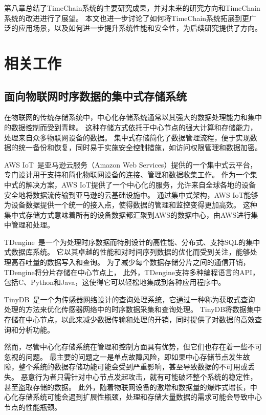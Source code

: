 第八章总结了TimeChain系统的主要研究成果，并对未来的研究方向和TimeChain系统的改进进行了展望。
本文也进一步讨论了如何将TimeChain系统拓展到更广泛的应用场景，以及如何进一步提升系统性能和安全性，为后续研究提供了方向。

\chapter{相关工作}
\section{面向物联网时序数据的集中式存储系统}
在物联网的传统存储系统中，中心化存储系统通常以其强大的数据处理能力和集中的数据控制而受到青睐。
这种存储方式依托于中心节点的强大计算和存储能力，处理来自众多物联网设备的数据。
集中式存储简化了数据管理流程，便于实现数据的统一备份和恢复，同时易于实施安全控制措施，如访问权限管理和数据加密。

AWS IoT~\cite{aws}是亚马逊云服务（Amazon Web Services）提供的一个集中式云平台，专门设计用于支持和简化物联网设备的连接、管理和数据收集工作。
作为一个集中式的解决方案，AWS IoT提供了一个中心化的服务，允许来自全球各地的设备安全地将数据流传输到亚马逊的云基础设施中。
通过集中式架构，AWS IoT能够为设备数据提供一个统一的接入点，使得数据的管理和监控变得更加高效。
这种集中式存储方式意味着所有的设备数据都汇聚到AWS的数据中心，由AWS进行集中管理和处理。

TDengine~\cite{tdengine}是一个为处理时序数据而特别设计的高性能、分布式、支持SQL的集中式数据库系统。
它以其卓越的性能和对时间序列数据的优化而受到关注，能够处理高吞吐量的数据写入和查询。
为了减少每个数据存储分片之间的通信开销，TDengine将分片存储在中心节点上，
此外，TDengine支持多种编程语言的API，包括C、Python和Java，这使得它可以轻松地集成到各种应用程序中。

TinyDB~\cite{madden2005tinydb}是一个为传感器网络设计的查询处理系统，它通过一种称为获取式查询处理的方法来优化传感器网络中的时序数据采集和查询处理。
TinyDB将数据集中存储在中心节点，以此来减少数据传输和处理的开销，同时提供了对数据的高效查询和分析功能。

然而，尽管中心化存储系统在管理和控制方面具有优势，但它们也存在着一些不可忽视的问题。
最主要的问题之一是单点故障风险，即如果中心存储节点发生故障，整个系统的数据存储功能可能会受到严重影响，甚至导致数据的不可用或丢失。
恶意行为者只需针对中心节点发起攻击，就有可能破坏整个系统的稳定性，甚至盗取存储的数据。
此外，随着物联网设备的激增和数据量的爆炸式增长，中心化存储系统可能会遇到扩展性瓶颈，处理和存储大量数据的需求可能会导致中心节点的性能瓶颈。

